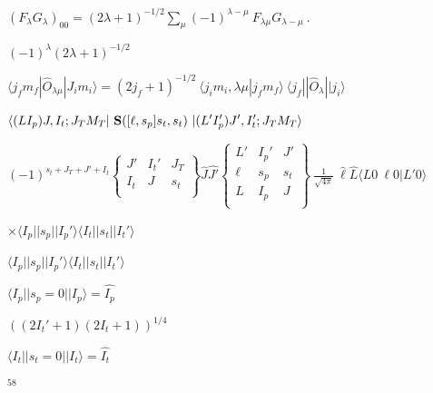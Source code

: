 \documentclass[11pt]{article}
\def\lthtmlcheckvsize{\ifdim\ht\sizebox<\vsize 
  \ifdim\wd\sizebox<\hsize\expandafter\hfill\fi \expandafter\vfill
  \else\expandafter\vss\fi}%
\begin{document}
{\newpage\clearpage
{}%
$\displaystyle (F_{\lambda} G_{\lambda})_{00}
  = (2\lambda+1)^{-1/2} \sum_{\mu} (-1)^{\lambda-\mu} ~ F_{\lambda\mu}
  G_{\lambda-\mu} \ .
$%
\lthtmlindisplaymathZ
\lthtmlcheckvsize\clearpage}

{\newpage\clearpage
{}%
$ (-1)^\lambda (2\lambda+1)^{-1/2} $%
\lthtmlindisplaymathZ
\lthtmlcheckvsize\clearpage}

{\newpage\clearpage
{}%
$\displaystyle \langle j_f m_f | \hat{O}_{\lambda \mu} | J_i m_i \rangle
 = (2j_f+1)^{-1/2} ~ \langle j_i m_i ,\lambda \mu | j_f m_f \rangle ~
\langle j_f || \hat{O}_\lambda || j_i\rangle
$%
\lthtmlindisplaymathZ
\lthtmlcheckvsize\clearpage}

{\newpage\clearpage
{}%
$\displaystyle \langle(LI_p)J,I_t;J_TM_T | ~{\bf S}([\ell,s_p]s_t,s_t) ~| (L'I_p')J',I_t';J_TM_T \rangle$%
\lthtmlindisplaymathZ
\lthtmlcheckvsize\clearpage}

{\newpage\clearpage
{}%
$\displaystyle (-1)^{s_t+J_T+J'+I_t}
\left\{ \begin{array}{ccc}
J'  & I_t' & J_T \\
I_t & J    & s_t \\
\end{array} \right\}   \hat{J} \hat{J'}
\left\{ \begin{array}{ccc}
L' & I_p' & J'  \\
\ell & s_p & s_t  \\
L & I_p & J  \\
\end{array} \right\}  ~
\frac{1}{\sqrt{4\pi}} ~ \hat{\ell} \hat{L} \langle L 0 \ \ell 0 | L'0 \rangle$%
\lthtmlindisplaymathZ
\lthtmlcheckvsize\clearpage}

{\newpage\clearpage
{}%
$\displaystyle \times \langle I_p||s_p||I_p'\rangle \langle I_t||s_t||I_t'\rangle$%
\lthtmlindisplaymathZ
\lthtmlcheckvsize\clearpage}

{\newpage\clearpage
{}%
$\langle I_p||s_p||I_p'\rangle \langle I_t||s_t||I_t'\rangle$%
\lthtmlindisplaymathZ
\lthtmlcheckvsize\clearpage}

{\newpage\clearpage
{}%
$\langle I_p||s_p=0||I_p\rangle = \hat{I_p}$%
\lthtmlindisplaymathZ
\lthtmlcheckvsize\clearpage}

{\newpage\clearpage
{}%
$((2I_t'+1)(2I_t+1))^{1/4}$%
\lthtmlindisplaymathZ
\lthtmlcheckvsize\clearpage}

{\newpage\clearpage
{}%
$\langle I_t||s_t=0||I_t\rangle = \hat{I_t}$%
\lthtmlindisplaymathZ
\lthtmlcheckvsize\clearpage}

{\newpage\clearpage
{}%
$^{58}$%
\lthtmlindisplaymathZ
\lthtmlcheckvsize\clearpage}
\end{document}
